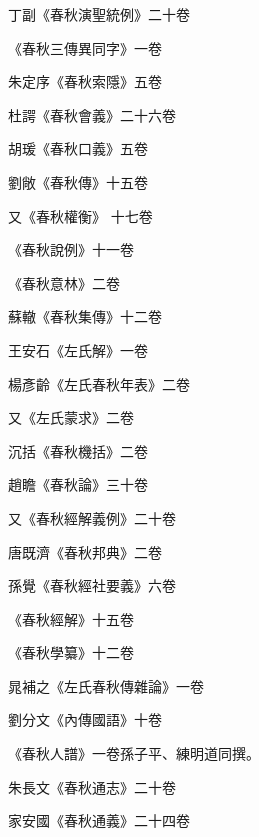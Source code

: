 \begin{pinyinscope}
 丁副《春秋演聖統例》二十卷



 《春秋三傳異同字》一卷



 朱定序《春秋索隱》五卷



 杜諤《春秋會義》二十六卷



 胡瑗《春秋口義》五卷



 劉敞《春秋傳》十五卷



 又《春秋權衡》
 十七卷



 《春秋說例》十一卷



 《春秋意林》二卷



 蘇轍《春秋集傳》十二卷



 王安石《左氏解》一卷



 楊彥齡《左氏春秋年表》二卷



 又《左氏蒙求》二卷



 沉括《春秋機括》二卷



 趙瞻《春秋論》三十卷



 又《春秋經解義例》二十卷



 唐既濟《春秋邦典》二卷



 孫覺《春秋經社要義》六卷



 《春秋經解》十五卷



 《春秋學纂》十二卷



 晁補之《左氏春秋傳雜論》一卷



 劉分文《內傳國語》十卷



 《春秋人譜》一卷孫子平、練明道同撰。



 朱長文《春秋通志》二十卷



 家安國《春秋通義》二十四卷




\end{pinyinscope}

